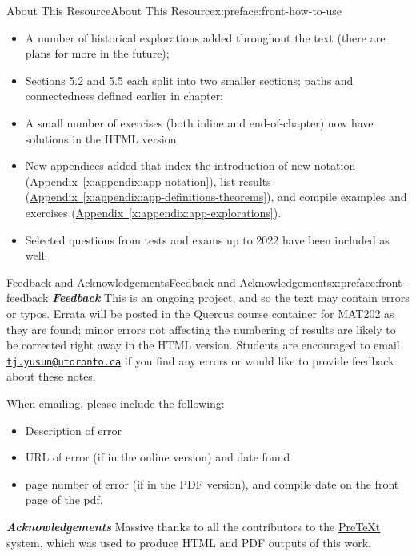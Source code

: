 \documentclass[oneside,10pt,]{book}
\newcommand{\xreffont}{\relax}
\newcommand{\mono}[1]{\texttt{#1}}
\newcommand{\alert}[1]{\textbf{\textit{#1}}}
\numberwithin{equation}{section}
\begin{document}
\begin{preface}{About This Resource}{}{About This Resource}{}{}{x:preface:front-how-to-use}
\begin{itemize}[label=\textbullet]
\item{}A number of historical explorations added throughout the text (there are plans for more in the future);%
\item{}Sections 5.2 and 5.5 each split into two smaller sections; paths and connectedness defined earlier in chapter;%
\item{}A small number of exercises (both inline and end-of-chapter) now have solutions in the HTML version;%
\item{}New appendices added that index the introduction of new notation (\hyperref[x:appendix:app-notation]{Appendix~{\xreffont\ref{x:appendix:app-notation}}}), list results (\hyperref[x:appendix:app-definitions-theorems]{Appendix~{\xreffont\ref{x:appendix:app-definitions-theorems}}}), and compile examples and exercises (\hyperref[x:appendix:app-explorations]{Appendix~{\xreffont\ref{x:appendix:app-explorations}}}).%
\item{}Selected questions from tests and exams up to 2022 have been included as well.%
\end{itemize}
%
\end{preface}
%
%
\typeout{************************************************}
\typeout{************************************************}
%
\begin{preface}{Feedback and Acknowledgements}{}{Feedback and Acknowledgements}{}{}{x:preface:front-feedback}
\alert{Feedback} This is an ongoing project, and so the text may contain errors or typos. Errata will be posted in the Quercus course container for MAT202 as they are found; minor errors not affecting the numbering of results are likely to be corrected right away in the HTML version. Students are encouraged to email \href{mailto:tj.yusun@utoronto.ca?subject=202notes-pretext}{\mono{tj.yusun@utoronto.ca}} if you find any errors or would like to provide feedback about these notes.%
\par
When emailing, please include the following:%
\begin{itemize}[label=\textbullet]
\item{}Description of error%
\item{}URL of error (if in the online version) and date found%
\item{}page number of error (if in the PDF version), and compile date on the front page of the pdf.%
\end{itemize}
%
\par
\alert{Acknowledgements} Massive thanks to all the contributors to the \href{https://pretextbook.org/}{PreTeXt} system, which was used to produce HTML and PDF outputs of this work.%
\end{preface}
\end{document}
